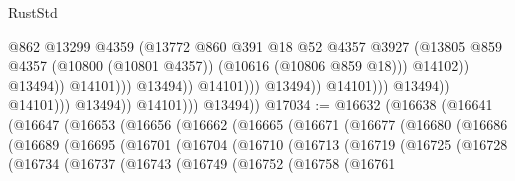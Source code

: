 \begin{lexlean}{RustStd}
\begin{coremodule}
                                                            @862
                                                            @13299
                                                            @4359
                                                            (@13772
                                                              @860
                                                              @391
                                                              @18
                                                              @52
                                                              @4357
                                                              @3927
                                                              (@13805
                                                                @859
                                                                @4357
                                                                (@10800 (@10801 @4357))
                                                                (@10616 (@10806 @859 @18)))
                                                              @14102))
                                                          @13494))
                                                      @14101)))
                                                @13494))
                                            @14101)))
                                      @13494))
                                  @14101)))
                            @13494))
                        @14101)))
                  @13494))
              @14101)))
        @13494))
@17034 := @16632
    (@16638
      (@16641
        (@16647
          (@16653
            (@16656
              (@16662
                (@16665
                  (@16671
                    (@16677
                      (@16680
                        (@16686
                          (@16689
                            (@16695
                              (@16701
                                (@16704
                                  (@16710
                                    (@16713
                                      (@16719
                                        (@16725
                                          (@16728
                                            (@16734
                                              (@16737
                                                (@16743
                                                  (@16749
                                                    (@16752
                                                      (@16758
                                                        (@16761

\end{coremodule}
\end{lexlean}
